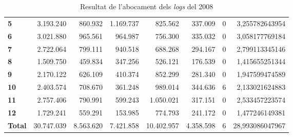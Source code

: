 \begin{table}[h!]
\begin{adjustbox}{width=1.5\textwidth, center}
\begin{tabular}{|l|r|r|r|r|r|r|r|}
            \midrule
            \textbf{5}     & 3.193.240  & 860.932   & 1.169.737 & 825.562    & 337.009   & 0 & 3,255782643954  \\
            \textbf{6}     & 3.021.880  & 965.561   & 964.987   & 756.300    & 335.032   & 0 & 3,058177769184  \\
            \textbf{7}     & 2.722.064  & 799.111   & 940.518   & 688.268    & 294.167   & 0 & 2,799113345146  \\
            \textbf{8}     & 1.509.750  & 459.834   & 347.256   & 526.121    & 176.539   & 0 & 1,415655251344  \\
            \midrule
            \textbf{9}     & 2.170.122  & 626.109   & 410.374   & 852.299    & 281.340   & 0 & 1,947599474589  \\
            \textbf{10}    & 2.403.574  & 708.670   & 361.248   & 989.014    & 344.636   & 6 & 2,133021624883  \\
            \textbf{11}    & 2.757.406  & 790.991   & 599.243   & 1.050.021  & 317.151   & 0 & 2,533457223574  \\
            \textbf{12}    & 1.729.241  & 559.291   & 153.985   & 774.793    & 241.172   & 0 & 1,477246149381  \\
            \midrule
            \textbf{Total} & 30.747.039 & 8.563.620 & 7.421.858 & 10.402.957 & 4.358.598 & 6 & 28,993086047967 \\
            \bottomrule
        \end{tabular}
    \end{adjustbox}
    \caption{Resultat de l'abocament dels \textit{logs} del 2008}
    \label{tab:logs-table-2008}
\end{table}
